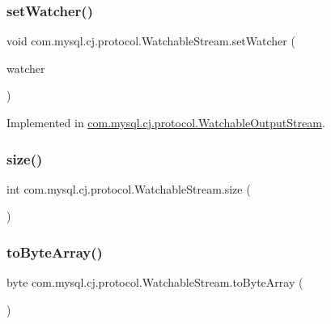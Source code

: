 \subsubsection{\texorpdfstring{set\+Watcher()}{setWatcher()}}
{\footnotesize\ttfamily void com.\+mysql.\+cj.\+protocol.\+Watchable\+Stream.\+set\+Watcher (\begin{DoxyParamCaption}\item[{\mbox{\hyperlink{interfacecom_1_1mysql_1_1cj_1_1protocol_1_1_output_stream_watcher}{Output\+Stream\+Watcher}}}]{watcher }\end{DoxyParamCaption})}



Implemented in \mbox{\hyperlink{classcom_1_1mysql_1_1cj_1_1protocol_1_1_watchable_output_stream_a58495ba6a5906781f2dc6f0b861dd0b8}{com.\+mysql.\+cj.\+protocol.\+Watchable\+Output\+Stream}}.

\mbox{\label{interfacecom_1_1mysql_1_1cj_1_1protocol_1_1_watchable_stream_a12dc589ba91926b7bb5ee65e59c262c7}} 
\subsubsection{\texorpdfstring{size()}{size()}}
{\footnotesize\ttfamily int com.\+mysql.\+cj.\+protocol.\+Watchable\+Stream.\+size (\begin{DoxyParamCaption}{ }\end{DoxyParamCaption})}

\mbox{\label{interfacecom_1_1mysql_1_1cj_1_1protocol_1_1_watchable_stream_a1f74a409c152e12945e1448b45bcc110}} 
\subsubsection{\texorpdfstring{to\+Byte\+Array()}{toByteArray()}}
{\footnotesize\ttfamily byte com.\+mysql.\+cj.\+protocol.\+Watchable\+Stream.\+to\+Byte\+Array (\begin{DoxyParamCaption}{ }\end{DoxyParamCaption})}

